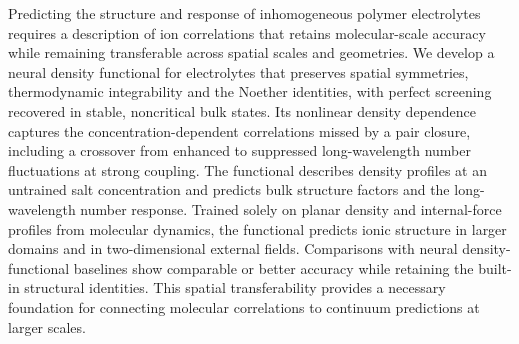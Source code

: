 Predicting the structure and response of inhomogeneous polymer electrolytes requires a description of ion correlations that retains molecular-scale accuracy while remaining transferable across spatial scales and geometries. We develop a neural density functional for electrolytes that preserves spatial symmetries, thermodynamic integrability and the Noether identities, with perfect screening recovered in stable, noncritical bulk states.
Its nonlinear density dependence captures the concentration-dependent correlations missed by a pair closure, including a crossover from enhanced to suppressed long-wavelength number fluctuations at strong coupling.
The functional describes density profiles at an untrained salt concentration and predicts bulk structure factors and the long-wavelength number response.
Trained solely on planar density and internal-force profiles from molecular dynamics, the functional predicts ionic structure in larger domains and in two-dimensional external fields.  Comparisons with neural density-functional baselines show comparable or better accuracy while retaining the built-in structural identities. This spatial transferability provides a necessary foundation for connecting molecular correlations to continuum predictions at larger scales.
